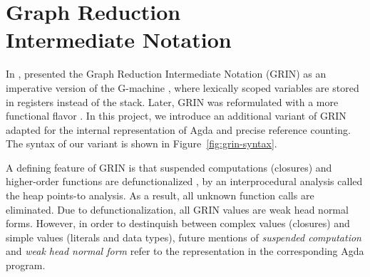 \documentclass[9pt, twocolumn]{article}
\begin{document}
\section{Graph Reduction \\ Intermediate Notation}
\label{sec:grin}
In \citeyear{johnsson1991}, \citeauthor{johnsson1991} presented the Graph Reduction Intermediate Notation (GRIN) as an imperative version of the G-machine \citep{johnsson1984}, where lexically scoped variables are stored in registers instead of the stack. 
Later, GRIN was reformulated with a more functional flavor \citep{boquist1995}.
In this project, we introduce an additional variant of GRIN adapted for the internal representation of Agda and precise reference counting. 
The syntax of our variant is shown in \mbox{Figure \ref{fig:grin-syntax}}.

A defining feature of GRIN is that suspended computations (closures) and higher-order functions are defunctionalized \citep{reynolds1972}, by 
an interprocedural analysis called the heap points-to analysis.
As a result, all unknown function calls are eliminated. 
Due to defunctionalization, all GRIN values are weak head normal forms.
However, in order to destinquish between complex values (closures) and simple values (literals and data types), 
future mentions of \emph{suspended computation} and \emph{weak head normal form} refer to the representation in the corresponding Agda program.
\end{document}
